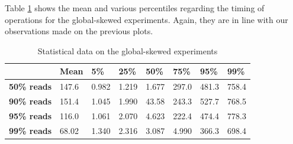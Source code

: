 Table \ref{tab:global-latencies-table} shows the mean and various percentiles regarding the timing of operations for the global-skewed experiments. Again, they are in line with our observations made on the previous plots.
\vfill
\begin{table}[!htb]
  \centering
  \begin{tabular}{l l l l l l l l}
    \hline
    & \textbf{Mean} & \textbf{5\%} & \textbf{25\%} & \textbf{50\%} & \textbf{75\%} & \textbf{95\%}& \textbf{99\%} \\
    \hline
    \textbf{50\% reads} & 147.6 & 0.982 & 1.219 & 1.677 & 297.0 & 481.3 & 758.4 \\
    \textbf{90\% reads} & 151.4 & 1.045 & 1.990 & 43.58 & 243.3 & 527.7 & 768.5 \\
    \textbf{95\% reads} & 116.0 & 1.061 & 2.070 & 4.623 & 222.4 & 474.4 & 778.3 \\
    \textbf{99\% reads} & 68.02 & 1.340 & 2.316 & 3.087 & 4.990 & 366.3 & 698.4 \\
    \hline
  \end{tabular}
  \caption{Statistical data on the global-skewed experiments}\label{tab:global-latencies-table}
\end{table}

